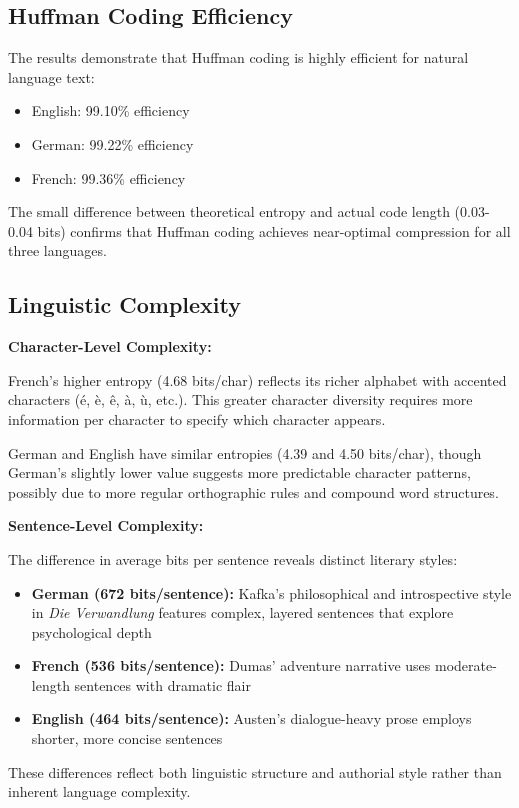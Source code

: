 \documentclass[11pt]{article}
\begin{document}
\subsection{Huffman Coding Efficiency}
The results demonstrate that Huffman coding is highly efficient for natural language text:
\begin{itemize}
    \item English: 99.10\% efficiency
    \item German: 99.22\% efficiency
    \item French: 99.36\% efficiency
\end{itemize}

The small difference between theoretical entropy and actual code length (0.03-0.04 bits) confirms that Huffman coding achieves near-optimal compression for all three languages.

\subsection{Linguistic Complexity}
\textbf{Character-Level Complexity:}

French's higher entropy (4.68 bits/char) reflects its richer alphabet with accented characters (é, è, ê, à, ù, etc.). This greater character diversity requires more information per character to specify which character appears.

German and English have similar entropies (4.39 and 4.50 bits/char), though German's slightly lower value suggests more predictable character patterns, possibly due to more regular orthographic rules and compound word structures.

\textbf{Sentence-Level Complexity:}

The difference in average bits per sentence reveals distinct literary styles:
\begin{itemize}
    \item \textbf{German (672 bits/sentence):} Kafka's philosophical and introspective style in \textit{Die Verwandlung} features complex, layered sentences that explore psychological depth
    \item \textbf{French (536 bits/sentence):} Dumas' adventure narrative uses moderate-length sentences with dramatic flair
    \item \textbf{English (464 bits/sentence):} Austen's dialogue-heavy prose employs shorter, more concise sentences
\end{itemize}

These differences reflect both linguistic structure and authorial style rather than inherent language complexity.
\end{document}
